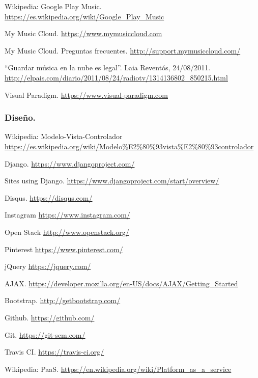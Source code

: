  Wikipedia: Google Play Music. \url{https://es.wikipedia.org/wiki/Google_Play_Music}

 My Music Cloud. \url{https://www.mymusiccloud.com}

 My Music Cloud. Preguntas frecuentes. \url{http://support.mymusiccloud.com/}

 ``Guardar música en la nube es legal''. Laia Reventós, 24/08/2011. \url{http://elpais.com/diario/2011/08/24/radiotv/1314136802_850215.html}

 Visual Paradigm. \url{https://www.visual-paradigm.com}

\subsubsection*{Diseño.}

 Wikipedia: Modelo-Vista-Controlador \url{https://es.wikipedia.org/wiki/Modelo%E2%80%93vista%E2%80%93controlador}

 Django. \url{https://www.djangoproject.com/}

 Sites using Django. \url{https://www.djangoproject.com/start/overview/}

 Disqus. \url{https://disqus.com/}

 Instagram \url{https://www.instagram.com/}

 Open Stack \url{http://www.openstack.org/}

 Pinterest \url{https://www.pinterest.com/}

 jQuery \url{https://jquery.com/}

 AJAX. \url{https://developer.mozilla.org/en-US/docs/AJAX/Getting_Started}

 Bootstrap. \url{http://getbootstrap.com/}

 Github. \url{https://github.com/}

 Git. \url{https://git-scm.com/}

 Travis CI. \url{https://travis-ci.org/}

 Wikipedia: PaaS. \url{https://en.wikipedia.org/wiki/Platform_as_a_service}


